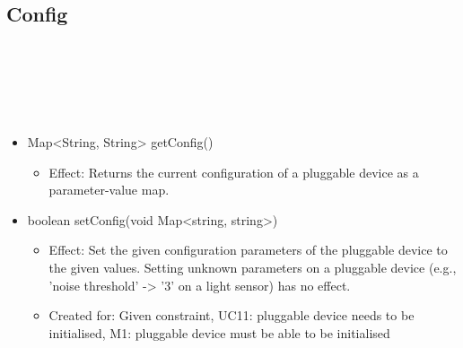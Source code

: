   \subsection{Config}\label{int:PuggableDevicePluggableDeviceConfig}
    \begin{description}
      \item[Provided by:] \iconcomponent{}~
      \item[Required by:] \iconcomponent{}~
      \item[Operations:] ~
    \begin{itemize}[noitemsep,nolistsep,leftmargin=-.25cm]
      \item \textsf{Map\textless{}String, String\textgreater{} getConfig()}
        \begin{itemize}[noitemsep,nolistsep]
           \item Effect: Returns the current configuration of a pluggable device as a parameter-value map.
        \end{itemize}
      \item \textsf{boolean setConfig(void Map<string, string>)}
        \begin{itemize}[noitemsep,nolistsep]
           \item Effect: Set the given configuration parameters of the pluggable device to the given values. Setting unknown parameters on a pluggable device (e.g., 'noise threshold' -> '3' on a light sensor) has no effect.
\item Created for: Given constraint, UC11: pluggable device needs to be initialised, M1: pluggable device must be able to be initialised
        \end{itemize}
    \end{itemize}
    \end{description}

